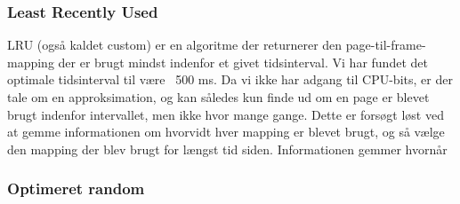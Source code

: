 	\subsubsection{Least Recently Used}
	LRU (også kaldet custom) er en algoritme der returnerer den page-til-frame-mapping der er brugt mindst indenfor et givet tidsinterval. Vi har fundet det optimale tidsinterval til være ~500 ms. Da vi ikke har adgang til CPU-bits, er der tale om en approksimation, og kan således kun finde ud om en page er blevet brugt indenfor intervallet, men ikke hvor mange gange. Dette er forsøgt løst ved at gemme informationen om hvorvidt hver mapping er blevet brugt, og så vælge den mapping der blev brugt for længst tid siden. Informationen gemmer hvornår 
	\subsubsection{Optimeret random}